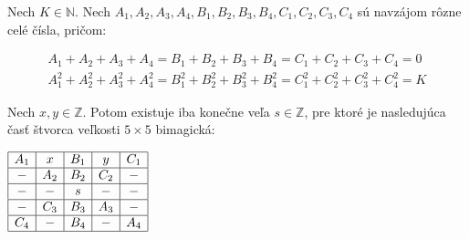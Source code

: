 \begin{theorem}
\label{5x5bimagic3}
Nech $K \in \mathbb{N}$. Nech $A_1, A_2, A_3, A_4, B_1, B_2, B_3, B_4, C_1, C_2, C_3, C_4$ sú navzájom rôzne celé čísla, pričom:

\begin{gather}
A_1 + A_2 + A_3 + A_4 = B_1 + B_2 + B_3 + B_4 = C_1 + C_2 + C_3 + C_4 = 0 \\
A_1^2 + A_2^2 + A_3^2 + A_4^2 = B_1^2 + B_2^2 + B_3^2 + B_4^2 = C_1^2 + C_2^2 + C_3^2 + C_4^2 = K
\end{gather}

Nech $x,y \in \mathbb{Z}$. Potom existuje iba konečne veľa $s \in \mathbb{Z}$, pre ktoré je nasledujúca časť štvorca veľkosti $5 \times 5$ bimagická: 

\begin{center}
$\begin{array}{ |c|c|c|c|c| }
\hline
A_1 & x & B_1 & y & C_1 \\ 
\hline
- & A_2 & B_2 & C_2 & -  \\ 
\hline
- & - & s & - & - \\ 
\hline
- & C_3 & B_3 & A_3 & - \\ 
\hline
C_4 & - & B_4 & - & A_4 \\ 
\hline
\end{array}$
\end{center}

\end{theorem}


